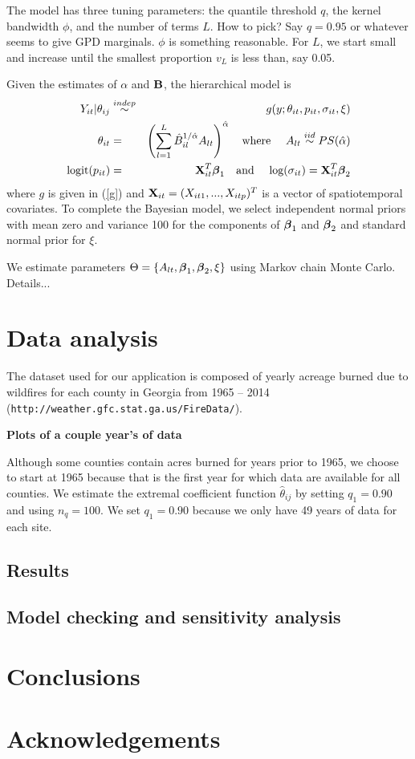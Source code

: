 \documentclass[12pt]{article}
\newcommand{\bbeta}{ \mbox{\boldmath $\beta$}}
\newcommand{\bX}{ \mbox{\bf X}}
\newcommand{\bB}{ \mbox{\bf B}}
\newcommand{\alphahat}{{\hat \alpha}}
\newcommand{\iid}{\stackrel{iid}{\sim}}
\newcommand{\indep}{\stackrel{indep}{\sim}}
\newcommand{\beqn}{ \begin{eqnarray}}
\newcommand{\eeqn}{ \end{eqnarray}}
\begin{document}
The model has three tuning parameters: the quantile threshold $q$, the kernel bandwidth $\phi$, and the number of terms $L$.  How to pick?  Say $q=0.95$ or whatever seems to give GPD marginals.  $\phi$ is something reasonable.  For $L$, we start small and increase until the smallest proportion $v_L$ is less than, say 0.05.  

Given the estimates of $\alpha$ and $\bB$, the hierarchical model is
\beqn \label{bayesmodel}
  Y_{it} |\theta_{ij} & \indep & g(y;\theta_{it},p_{it},\sigma_{it},\xi) \\
  \theta_{it} &=& \left(\sum_{l=1}^L{\hat B}_{il}^{1/\alphahat}A_{lt}\right)^{\alphahat}
  \mbox{\ \ \ where \ \ \ }
  A_{lt} \iid PS(\alphahat)\nonumber\\
  \mbox{logit}(p_{it}) &=& \bX_{it}^T\bbeta_1 
  \mbox{\ \ \ and \ \ \ }
  \mbox{log}(\sigma_{it}) = \bX_{it}^T\bbeta_2 \nonumber
\eeqn
where $g$ is given in (\ref{g}) and $\bX_{it} = (X_{it1},...,X_{itp})^T$ is a vector of spatiotemporal covariates.  To complete the Bayesian model, we select independent normal priors with mean zero and variance 100 for the components of $\bbeta_1$ and $\bbeta_2$ and standard normal prior for $\xi$.

We estimate parameters $\Theta=\{A_{lt}, \bbeta_1,\bbeta_2,\xi\}$ using Markov chain Monte Carlo. Details...

\section{Data analysis}\label{s:analysis}
The dataset used for our application is composed of yearly acreage burned due to wildfires for each county in Georgia from 1965 -- 2014 (\texttt{http://weather.gfc.stat.ga.us/FireData/}).

\textbf{Plots of a couple year's of data}

Although some counties contain acres burned for years prior to 1965, we choose to start at 1965 because that is the first year for which data are available for all counties.
We estimate the extremal coefficient function $\hat{\theta}_{ij}$ by setting $q_1 = 0.90$ and using $n_q = 100$.
We set $q_1 = 0.90$ because we only have 49 years of data for each site.


\subsection{Results}\label{s:results}

\subsection{Model checking and sensitivity analysis}


\section{Conclusions}\label{s:con}

\section*{Acknowledgements}


\begin{singlespace}


\end{singlespace}
\end{document}
